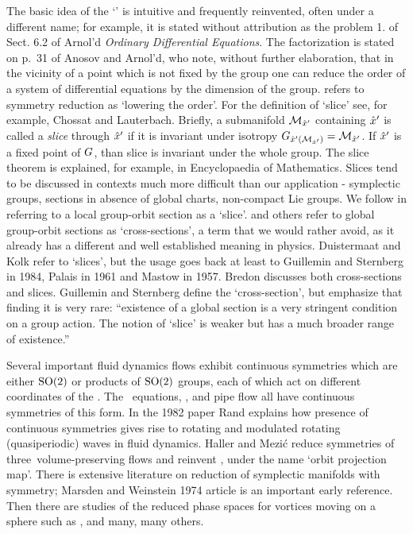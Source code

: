 \documentclass[12pt]{article}
\begin{document}
{The basic idea of the `\mslices' is intuitive and
frequently reinvented, often under a different name; for example,
it is stated without attribution as the problem 1. of Sect.
6.2 of Arnol'd {\em Ordinary Differential
Equations}. The factorization
is stated on p.~31 of Anosov and
Arnol'd, who note, without further elaboration,
that in the vicinity of a point which is not fixed by the
group one can reduce the order of a system of differential
equations by the dimension of the group.
 refers to symmetry reduction as `lowering the order'.
For the definition of `slice' see, for example,  Chossat
and Lauterbach. Briefly, a submanifold $\mathcal{M}_{{\hat{x}'}}$
containing ${\hat{x}'}$ is called a {\em slice} through
${\hat{x}'}$ if it is invariant under isotropy
$G_{{\hat{x}'}(\mathcal{M}_{{\hat{x}'}})}=\mathcal{M}_{{\hat{x}'}}$. If ${\hat{x}'}$ is a
fixed point of $G$, than slice is invariant under the
whole group. The slice theorem is explained, for example, in
 {Encyclopaedia of
Mathematics}.
Slices tend to be discussed in contexts much more difficult
than our application - symplectic groups, sections in absence
of global charts, non-compact Lie groups. We follow
 in referring to a local
group-orbit section as a `slice'. 
and others refer to global group-orbit sections as
`cross-sections', a term that we would rather avoid, as it
already has a different and well established meaning in
physics. Duistermaat and Kolk refer to `slices',
but the usage goes back at least to Guillemin and
Sternberg in 1984, Palais in 1961 and
Mastow in 1957. Bredon discusses
both cross-sections and slices. Guillemin and
Sternberg define the `cross-section', but
emphasize that finding it is very rare: ``existence of a
global section is a very stringent condition on a group
action. The notion of `slice' is weaker but has a much
broader range of existence.''

Several important fluid dynamics flows exhibit continuous symmetries
which are either $\textrm{SO}(2)$ or products of $\textrm{SO}(2)$ groups, each of which
act on different coordinates of the {\statesp}. The \KS\
equations,
{\pCf}, and
pipe flow all have continuous symmetries of this
form.
In the 1982 paper Rand explains how
presence of continuous symmetries gives rise to rotating and
modulated rotating (quasiperiodic) waves in fluid dynamics.
Haller and Mezi\'c reduce symmetries of
three\dmn\ volume-preserving flows and reinvent
\mframes, under the name `orbit projection map'. There is
extensive literature on reduction of symplectic manifolds
with symmetry; Marsden and Weinstein 1974 article
is an important early reference. Then there are studies of
the reduced phase spaces for vortices moving on a sphere such
as , and many, many others.

}
\end{document}
